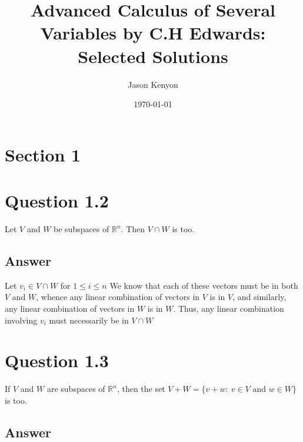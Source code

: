 \documentclass[
	12pt, %
]{fphw}
\title{Advanced Calculus of Several Variables by C.H Edwards: Selected Solutions} %
\author{Jason Kenyon} %
\date{\today} %
\institute{Binghamton University \\ Department of Mathematical Sciences} %
\begin{document}
\maketitle %
\section*{Section 1}

\section*{Question 1.2}

\begin{problem}
	Let $V$ and $W$ be subspaces of $\mathbb{R}^n$. Then $V \cap W$ is too. 
\end{problem}

\subsection*{Answer}

Let $v_i \in V \cap W$ for $1 \leq i \leq n $ We know that each of these vectors must be in both $V$ and $W$, whence any linear combination of vectors in $V$ is in $V$, and similarly, any linear combination of vectors in $W$ is in $W$. 
Thus, any linear combination involving $v_i$ must necessarily be in $V \cap W$

\section*{Question 1.3}

\begin{problem}
	If $V$ and $W$ are subspaces of $\mathbb{R}^n$, then the set $V+W=\{v+w: \ v \in V \text{ and }  w \in W\}$ is too.
\end{problem}


\subsection*{Answer}
\end{document}
